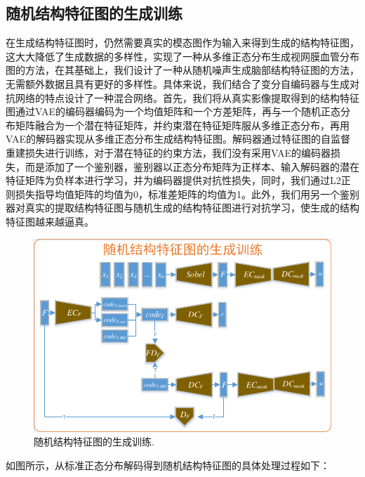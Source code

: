 \documentclass[letterpaper]{article} %
\begin{document}
\subsection{随机结构特征图的生成训练}
在生成结构特征图时，\cite{4shin2018medical}仍然需要真实的模态图作为输入来得到生成的结构特征图，这大大降低了生成数据的多样性，\cite{41costa2017towards}实现了一种从多维正态分布生成视网膜血管分布图的方法，在其基础上，我们设计了一种从随机噪声生成脑部结构特征图的方法，无需额外数据且具有更好的多样性。具体来说，我们结合了变分自编码器与生成对抗网络的特点设计了一种混合网络。首先，我们将从真实影像提取得到的结构特征图通过VAE的编码器编码为一个均值矩阵和一个方差矩阵，再与一个随机正态分布矩阵融合为一个潜在特征矩阵，并约束潜在特征矩阵服从多维正态分布，再用VAE的解码器实现从多维正态分布生成结构特征图。解码器通过特征图的自监督重建损失进行训练，对于潜在特征的约束方法，我们没有采用VAE的编码器损失，而是添加了一个鉴别器，鉴别器以正态分布矩阵为正样本、输入解码器的潜在特征矩阵为负样本进行学习，并为编码器提供对抗性损失，同时，我们通过L2正则损失指导均值矩阵的均值为0，标准差矩阵的均值为1。此外，我们用另一个鉴别器对真实的提取结构特征图与随机生成的结构特征图进行对抗学习，使生成的结构特征图越来越逼真。
\begin{figure}
	\centering
	\includegraphics[width=0.98\linewidth]{figures/feature_train}
	\caption{随机结构特征图的生成训练.}
	\label{feature_train}
\end{figure}
如图所示，从标准正态分布解码得到随机结构特征图的具体处理过程如下：
\end{document}
